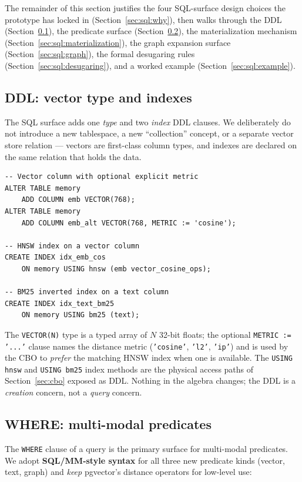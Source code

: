 \documentclass[sigconf,nonacm,review]{acmart}
\theoremstyle{plain}
\theoremstyle{definition}
\theoremstyle{remark}
\begin{document}
The remainder of this section justifies the four SQL-surface
design choices the prototype has locked in
(Section~\ref{sec:sql:why}), then walks through the DDL
(Section~\ref{sec:sql:ddl}), the predicate surface
(Section~\ref{sec:sql:predicates}), the materialization
mechanism (Section~\ref{sec:sql:materialization}), the graph
expansion surface (Section~\ref{sec:sql:graph}), the formal
desugaring rules (Section~\ref{sec:sql:desugaring}), and a
worked example (Section~\ref{sec:sql:example}).

\subsection{DDL: vector type and indexes}\label{sec:sql:ddl}

The SQL surface adds one \emph{type} and two \emph{index} DDL
clauses. We deliberately do not introduce a new tablespace, a
new ``collection'' concept, or a separate vector store relation
--- vectors are first-class column types, and indexes are
declared on the same relation that holds the data.

\begin{lstlisting}
-- Vector column with optional explicit metric
ALTER TABLE memory
    ADD COLUMN emb VECTOR(768);
ALTER TABLE memory
    ADD COLUMN emb_alt VECTOR(768, METRIC := 'cosine');

-- HNSW index on a vector column
CREATE INDEX idx_emb_cos
    ON memory USING hnsw (emb vector_cosine_ops);

-- BM25 inverted index on a text column
CREATE INDEX idx_text_bm25
    ON memory USING bm25 (text);
\end{lstlisting}

The \texttt{VECTOR(N)} type is a typed array of $N$ 32-bit
floats; the optional \texttt{METRIC := '...'} clause names the
distance metric (\texttt{'cosine'}, \texttt{'l2'},
\texttt{'ip'}) and is used by the CBO to \emph{prefer} the
matching HNSW index when one is available. The
\texttt{USING hnsw} and \texttt{USING bm25} index methods are
the physical access paths of Section~\ref{sec:cbo} exposed as
DDL. Nothing in the algebra changes; the DDL is a
\emph{creation} concern, not a \emph{query} concern.

\subsection{WHERE: multi-modal predicates}\label{sec:sql:predicates}

The \texttt{WHERE} clause of a query is the primary surface
for multi-modal predicates. We adopt \textbf{SQL/MM-style
syntax} for all three new predicate kinds (vector, text,
graph) and \emph{keep} pgvector's distance operators for
low-level use:
\end{document}
